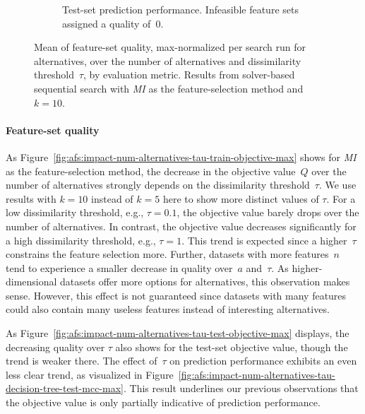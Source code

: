 \documentclass{article}
\theoremstyle{definition}
\begin{document}
\begin{figure}[p]
\begin{subfigure}[t]{0.48\textwidth}
		\caption{
			Test-set prediction performance.
			Infeasible feature sets assigned a quality of~0.
		}
		\label{fig:afs:impact-num-alternatives-tau-decision-tree-test-mcc-max-fillna}
	\end{subfigure}
	\caption{
		Mean of feature-set quality, max-normalized per search run for alternatives, over the number of alternatives and dissimilarity threshold~$\tau$, by evaluation metric.
		Results from solver-based sequential search with \emph{MI} as the feature-selection method and $k=10$.
	}
	\label{fig:afs:impact-num-alternatives-tau-quality}
\end{figure}

\paragraph{Feature-set quality}

As Figure~\ref{fig:afs:impact-num-alternatives-tau-train-objective-max} shows for \emph{MI} as the feature-selection method, the decrease in the objective value~$Q$ over the number of alternatives strongly depends on the dissimilarity threshold~$\tau$.
We use results with $k=10$ instead of $k=5$ here to show more distinct values of $\tau$.
For a low dissimilarity threshold, e.g., $\tau=0.1$, the objective value barely drops over the number of alternatives.
In contrast, the objective value decreases significantly for a high dissimilarity threshold, e.g., $\tau=1$.
This trend is expected since a higher~$\tau$ constrains the feature selection more.
Further, datasets with more features~$n$ tend to experience a smaller decrease in quality over~$a$ and~$\tau$.
As higher-dimensional datasets offer more options for alternatives, this observation makes sense.
However, this effect is not guaranteed since datasets with many features could also contain many useless features instead of interesting alternatives.

As Figure~\ref{fig:afs:impact-num-alternatives-tau-test-objective-max} displays, the decreasing quality over $\tau$ also shows for the test-set objective value, though the trend is weaker there.
The effect of~$\tau$ on prediction performance exhibits an even less clear trend, as visualized in Figure~\ref{fig:afs:impact-num-alternatives-tau-decision-tree-test-mcc-max}.
This result underlines our previous observations that the objective value is only partially indicative of prediction performance.
\end{document}
